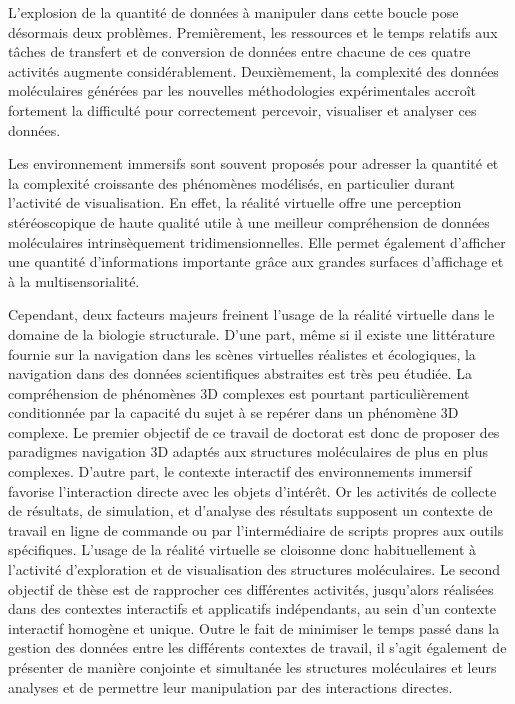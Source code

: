 L'explosion de la quantité de données à manipuler dans cette boucle pose désormais deux problèmes. Premièrement, les ressources et le temps relatifs aux tâches de transfert et de conversion de données entre chacune de ces quatre activités augmente considérablement. Deuxièmement, la complexité des données moléculaires générées par les nouvelles méthodologies expérimentales accroît fortement la difficulté pour correctement percevoir, visualiser et analyser ces données.

Les environnement immersifs sont souvent proposés pour adresser la quantité et la complexité croissante des phénomènes modélisés, en particulier durant l'activité de visualisation. En effet, la réalité virtuelle offre une perception stéréoscopique de haute qualité utile à une meilleur compréhension de données moléculaires intrinsèquement tridimensionnelles. Elle permet également d'afficher une quantité d'informations importante grâce aux grandes surfaces d'affichage et à la multisensorialité. 

Cependant, deux facteurs majeurs freinent l'usage de la réalité virtuelle dans le domaine de la biologie structurale. D'une part, même si il existe une littérature fournie sur la navigation dans les scènes virtuelles réalistes et écologiques, la navigation dans des données scientifiques abstraites est très peu étudiée. La compréhension de phénomènes 3D complexes est pourtant particulièrement conditionnée par la capacité du sujet à se repérer dans un phénomène 3D complexe. Le premier objectif de ce travail de doctorat est donc de proposer des paradigmes navigation 3D adaptés aux structures moléculaires de plus en plus complexes. D'autre part, le contexte interactif des environnements immersif favorise l'interaction directe avec les objets d'intérêt. Or les activités de collecte de résultats, de simulation, et d'analyse des résultats supposent un contexte de travail en ligne de commande ou par l'intermédiaire de scripts propres aux outils spécifiques. L'usage de la réalité virtuelle se cloisonne donc habituellement à l'activité d'exploration et de visualisation des structures moléculaires. Le second objectif de thèse est de rapprocher ces différentes activités, jusqu'alors réalisées dans des contextes interactifs et applicatifs indépendants, au sein d'un contexte interactif homogène et unique. Outre le fait de minimiser le temps passé dans la gestion des données entre les différents contextes de travail, il s'agit également de présenter de manière conjointe et simultanée les structures moléculaires et leurs analyses et de permettre leur manipulation par des interactions directes.

